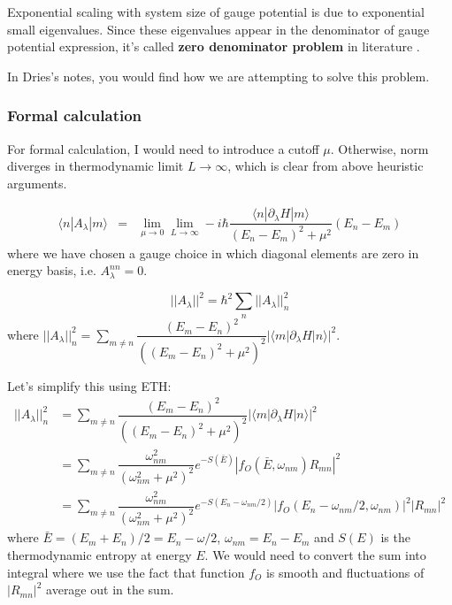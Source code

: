 \documentclass[11pt,a4paper]{article}
\begin{document}
Exponential scaling with system size of gauge potential is due to exponential small eigenvalues. Since these eigenvalues appear in the denominator of gauge potential expression, it's called \textbf{zero denominator problem} in literature \cite{kolodrubetz2016geometry}. 

In Dries's notes, you would find how we are attempting to solve this problem.

\subsubsection{Formal calculation}
For formal calculation, I would need to introduce a cutoff $\mu$. Otherwise, norm diverges in thermodynamic limit $L \rightarrow \infty$, which is clear from above heuristic arguments.

\begin{eqnarray}
\langle n | A_{\lambda} | m \rangle &=& \lim_{\mu \rightarrow 0} \lim_{L \rightarrow \infty } -i \hbar \dfrac{\langle n | \partial_{\lambda}H  | m \rangle}{(E_n-E_m)^2 + \mu^2} (E_n-E_m) 
\label{off-digonal}
\end{eqnarray}
where we have chosen a gauge choice in which diagonal elements are zero in energy basis, i.e. $A_{\lambda}^{nn}=0$. 

\begin{equation}
||A_{\lambda}||^2 = \hbar^2\sum_n ||A_{\lambda}||^2_{n}
\end{equation}
where $||A_{\lambda}||^2_{n} =\sum_{m \neq n}  \dfrac{(E_m-E_n)^2}{((E_m-E_n)^2 + \mu^2)^2} |\langle m | \partial_{\lambda}H| n \rangle|^2$.

Let's simplify this using ETH:
\begin{align*}
||A_{\lambda}||^2_{n} &= \sum_{m \neq n}  \dfrac{(E_m-E_n)^2}{((E_m-E_n)^2 + \mu^2)^2} |\langle m | \partial_{\lambda}H| n \rangle|^2\\
&=\sum_{m \neq n}  \dfrac{\omega_{nm}^2}{(\omega_{nm}^2 + \mu^2)^2} e^{-S(\bar{E})} |f_O(\bar{E}, \omega_{nm}) R_{mn}|^2\\
&=\sum_{m \neq n}  \dfrac{\omega_{nm}^2}{(\omega_{nm}^2 + \mu^2)^2} e^{-S(E_n -\omega_{nm}/2)} |f_O(E_n - \omega_{nm}/2, \omega_{nm})|^2 |R_{mn}|^2
\end{align*}
where $\bar{E}= (E_m +E_n)/2=E_n - \omega/2$, $\omega_{nm}= E_n- E_m$ and $S(E)$ is the thermodynamic entropy at energy $E$.
We would need to convert the sum into integral where we use the fact that function $f_O$ is smooth and fluctuations of $|R_{mn}|^2$ average out in the sum.
\end{document}
